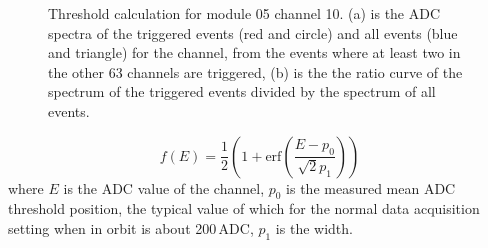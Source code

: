 \documentclass[preprint,sort&compress,12pt]{elsarticle}
\begin{document}
\begin{figure}[!hb]
\centering
{}
\hspace{2mm}
\caption{Threshold calculation for module 05 channel 10. (a) is the ADC spectra of the triggered events (red and circle) and all events (blue and triangle) for the channel, from the events where at least two in the other 63 channels are triggered, (b) is the the ratio curve of the spectrum of the triggered events divided by the spectrum of all events.}\label{fig:threshold}
\end{figure}

\begin{equation}\label{equ:threshold}
f(E) = \frac{1}{2}\left(1 + \mathrm{erf}\left(\frac{E - p_0}{\sqrt{2}p_1}\right)\right)
\end{equation}
where $E$ is the ADC value of the channel, $p_0$ is the measured mean ADC threshold position, the typical value of which for the normal data acquisition setting when in orbit is about 200\,ADC, $p_1$ is the width.
\end{document}
